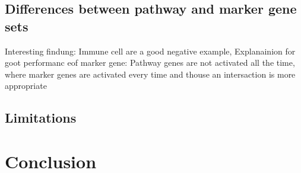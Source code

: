\documentclass{thesisclass}
\begin{document}
\section{Differences between pathway and marker gene sets}

Interesting findung: Immune cell are a good negative example, Explanainion for goot performanc eof marker gene: Pathway genes are not activated all the time, where marker genes are activated every time and thouse an intersaction is more appropriate

\section{Limitations}







\chapter{Conclusion}
\label{ch:conclusion}







\end{document}

